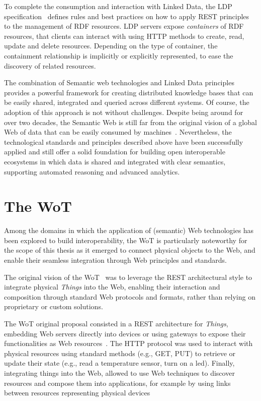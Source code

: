 To complete the consumption and interaction with Linked Data, the \ac{LDP} specification~\cite{ldp} defines rules and best practices on how to apply \ac{REST} principles to the management of \ac{RDF} resources.
%
\ac{LDP} servers expose \emph{containers} of \ac{RDF} resources, that clients can interact with using \ac{HTTP} methods to create, read, update and delete resources. Depending on the type of container, the containment relationship is implicitly or explicitly represented, to ease the discovery of related resources.

The combination of Semantic web technologies and Linked Data principles provides a powerful framework for creating distributed knowledge bases that can be easily shared, integrated and queried across different systems.
%
Of course, the adoption of this approach is not without challenges. 
%
Despite being around for over two decades, the Semantic Web is still far from the original vision of a global Web of data that can be easily consumed by machines~\cite{Hogan_2020}. 
%
Nevertheless, the technological standards and principles described above have been successfully applied and still offer a solid foundation for building open interoperable ecosystems in which data is shared and integrated with clear semantics, supporting automated reasoning and advanced analytics.


\section{The \acl{WoT}}

Among the domains in which the application of (semantic) Web technologies has been explored to build interoperability, the \ac{WoT} is particularly noteworthy for the scope of this thesis as it emerged to connect physical objects to the Web, and enable their seamless integration through Web principles and standards.

The original vision of the \ac{WoT}~\cite{Wilde_2007,dguinard:wotMashups:2009} was to leverage the \ac{REST} architectural style to integrate physical \emph{Things} into the Web, enabling their interaction and composition through standard Web protocols and formats, rather than relying on proprietary or custom solutions.

The \ac{WoT} original proposal consisted in a \ac{REST} architecture for \emph{Things}, embedding Web servers directly into devices or using gateways to expose their functionalities as Web resources~\cite{Guinard_Trifa_Wilde_2010}.
%
The \ac{HTTP} protocol was used to interact with physical resources using standard methods (e.g., GET, PUT) to retrieve or update their state (e.g., read a temperature sensor, turn on a led).
%
Finally, integrating things into the Web, allowed to use Web techniques to discover resources and compose them into applications, for example by using links between resources representing physical devices~\cite{guinard}

